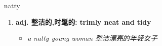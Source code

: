
\begin{frame}
{\huge natty}
\begin{center}
\begin{enumerate}\Large
  \item \textbf{adj. 整洁的,时髦的: trimly neat and tidy}
  \begin{itemize}
    \item \em{\Large{a natty young woman 整洁漂亮的年轻女子}}
  \end{itemize}
\end{enumerate}
\end{center}
\end{frame}

